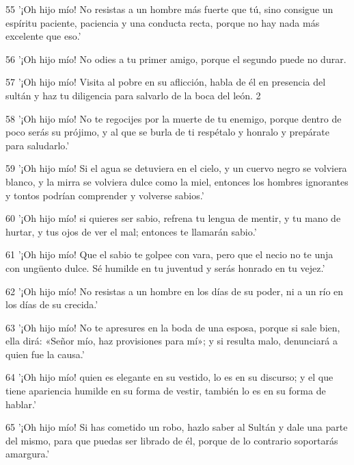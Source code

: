 \par 55 '¡Oh hijo mío! No resistas a un hombre más fuerte que tú, sino consigue un espíritu paciente, paciencia y una conducta recta, porque no hay nada más excelente que eso.'

\par 56 '¡Oh hijo mío! No odies a tu primer amigo, porque el segundo puede no durar.

\par 57 '¡Oh hijo mío! Visita al pobre en su aflicción, habla de él en presencia del sultán y haz tu diligencia para salvarlo de la boca del león. 2

\par 58 '¡Oh hijo mío! No te regocijes por la muerte de tu enemigo, porque dentro de poco serás su prójimo, y al que se burla de ti respétalo y honralo y prepárate para saludarlo.'

\par 59 '¡Oh hijo mío! Si el agua se detuviera en el cielo, y un cuervo negro se volviera blanco, y la mirra se volviera dulce como la miel, entonces los hombres ignorantes y tontos podrían comprender y volverse sabios.'

\par 60 '¡Oh hijo mío! si quieres ser sabio, refrena tu lengua de mentir, y tu mano de hurtar, y tus ojos de ver el mal; entonces te llamarán sabio.'

\par 61 '¡Oh hijo mío! Que el sabio te golpee con vara, pero que el necio no te unja con ungüento dulce. Sé humilde en tu juventud y serás honrado en tu vejez.'

\par 62 '¡Oh hijo mío! No resistas a un hombre en los días de su poder, ni a un río en los días de su crecida.'

\par 63 '¡Oh hijo mío! No te apresures en la boda de una esposa, porque si sale bien, ella dirá: «Señor mío, haz provisiones para mí»; y si resulta malo, denunciará a quien fue la causa.'

\par 64 '¡Oh hijo mío! quien es elegante en su vestido, lo es en su discurso; y el que tiene apariencia humilde en su forma de vestir, también lo es en su forma de hablar.'

\par 65 '¡Oh hijo mío! Si has cometido un robo, hazlo saber al Sultán y dale una parte del mismo, para que puedas ser librado de él, porque de lo contrario soportarás amargura.'

